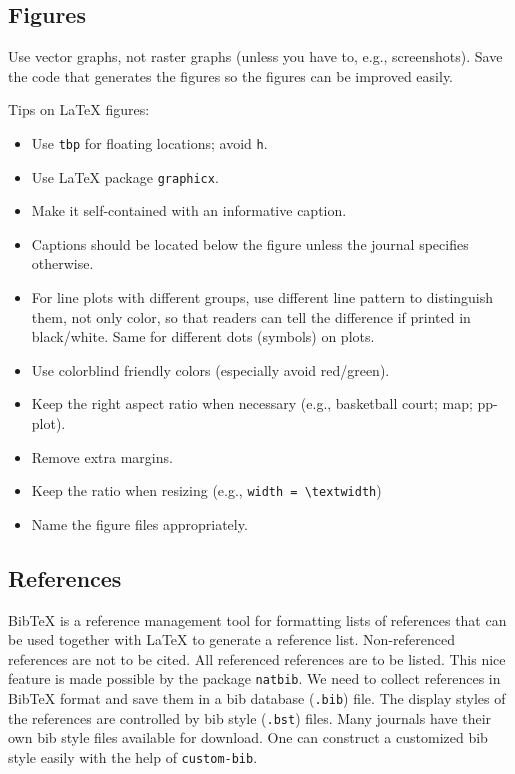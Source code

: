 \documentclass[
]{book}
\providecommand{\tightlist}{%
  \setlength{\itemsep}{0pt}\setlength{\parskip}{0pt}}
\theoremstyle{definition}
\theoremstyle{definition}
\theoremstyle{definition}
\theoremstyle{definition}
\theoremstyle{remark}
\begin{document}
\subsection{Figures}\label{figures}

Use vector graphs, not raster graphs (unless you have to, e.g.,
screenshots). Save the code that generates the figures so the figures can be
improved easily.

Tips on LaTeX figures:

\begin{itemize}
\tightlist
\item
  Use \texttt{tbp} for floating locations; avoid \texttt{h}.
\item
  Use LaTeX package \texttt{graphicx}.
\item
  Make it self-contained with an informative caption.
\item
  Captions should be located below the figure unless the journal specifies
  otherwise.
\item
  For line plots with different groups, use different line pattern to
  distinguish them, not only color, so that readers can tell the difference if
  printed in black/white. Same for different dots (symbols) on plots.
\item
  Use colorblind friendly colors (especially avoid red/green).
\item
  Keep the right aspect ratio when necessary (e.g., basketball court; map;
  pp-plot).
\item
  Remove extra margins.
\item
  Keep the ratio when resizing (e.g., \texttt{width\ =\ \textbackslash{}textwidth})
\item
  Name the figure files appropriately.
\end{itemize}

\subsection{References}\label{references}

BibTeX is a reference management tool for formatting lists of references that
can be used together with LaTeX to generate a reference list.
Non-referenced
references are not to be cited. All referenced references are to be listed. This
nice feature is made possible by the package \texttt{natbib}. We need to collect
references in BibTeX format and save them in a bib database (\texttt{.bib}) file. The
display styles of the references are controlled by bib style (\texttt{.bst})
files. Many journals have their own bib style files available for download. One
can construct a customized bib style easily with the help of \texttt{custom-bib}.
\end{document}
